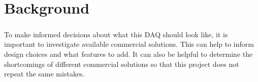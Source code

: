 \chapter{Background}

\paragraph{}
To make informed decisions about what this DAQ should look like, it is important to investigate available commercial solutions.
This can help to inform design choices and what features to add.
It can also be helpful to determine the shortcomings of different commercial solutions so that this project does not repeat the same mistakes.